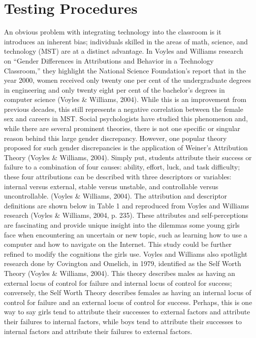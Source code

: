 \section{Testing Procedures}
An obvious problem with integrating technology into the classroom is it introduces an inherent bias; individuals skilled in the areas of math, science, and technology (MST) are at a distinct advantage.  In Voyles and Williams research on “Gender Differences in Attributions and Behavior in a Technology Classroom,” they highlight the National Science Foundation’s report that in the year 2000, women received only twenty one per cent of the undergraduate degrees in engineering and only twenty eight per cent of the bachelor’s degrees in computer science (Voyles \& Williams, 2004).  While this is an improvement from previous decades, this still represents a negative correlation between the female sex and careers in MST.  Social psychologists have studied this phenomenon and, while there are several prominent theories, there is not one specific or singular reason behind this large gender discrepancy.  
However, one popular theory proposed for such gender discrepancies is the application of Weiner’s Attribution Theory (Voyles \& Williams, 2004).  Simply put, students attribute their success or failure to a combination of four causes: ability, effort, luck, and task difficulty; these four attributions can be described with three descriptors or variables: internal versus external, stable versus unstable, and controllable versus uncontrollable.  (Voyles \& Williams, 2004). The attribution and descriptor definitions are shown below in Table 1 and reproduced from Voyles and Williams research (Voyles \& Williams, 2004, p. 235).  These attributes and self-perceptions are fascinating and provide unique insight into the dilemmas some young girls face when encountering an uncertain or new topic, such as learning how to use a computer and how to navigate on the Internet. This study could be further refined to modify the cognitions the girls use. 
Voyles and Williams also spotlight research done by Covington and Omelich, in 1979, identified as the Self Worth Theory (Voyles \& Williams, 2004). This theory describes males as having an external locus of control for failure and internal locus of control for success; conversely, the Self Worth Theory describes females as having an internal locus of control for failure and an external locus of control for success. Perhaps, this is one way to say girls tend to attribute their successes to external factors and attribute their failures to internal factors, while boys tend to attribute their successes to internal factors and attribute their failures to external factors.   
